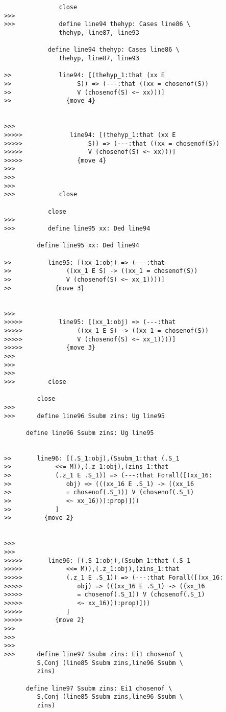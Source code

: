 \documentclass[12pt]{article}
\begin{document}
\begin{verbatim}
               close
>>>
>>>            define line94 thehyp: Cases line86 \
               thehyp, line87, line93

            define line94 thehyp: Cases line86 \
               thehyp, line87, line93

>>             line94: [(thehyp_1:that (xx E
>>                  S)) => (---:that ((xx = chosenof(S))
>>                  V (chosenof(S) <~ xx)))]
>>               {move 4}


>>>
>>>>>             line94: [(thehyp_1:that (xx E
>>>>>                  S)) => (---:that ((xx = chosenof(S))
>>>>>                  V (chosenof(S) <~ xx)))]
>>>>>               {move 4}
>>>
>>>
>>>
>>>            close

            close
>>>
>>>         define line95 xx: Ded line94

         define line95 xx: Ded line94

>>          line95: [(xx_1:obj) => (---:that
>>               ((xx_1 E S) -> ((xx_1 = chosenof(S))
>>               V (chosenof(S) <~ xx_1))))]
>>            {move 3}


>>>
>>>>>          line95: [(xx_1:obj) => (---:that
>>>>>               ((xx_1 E S) -> ((xx_1 = chosenof(S))
>>>>>               V (chosenof(S) <~ xx_1))))]
>>>>>            {move 3}
>>>
>>>
>>>
>>>         close

         close
>>>
>>>      define line96 Ssubm zins: Ug line95

      define line96 Ssubm zins: Ug line95


>>       line96: [(.S_1:obj),(Ssubm_1:that (.S_1
>>            <<= M)),(.z_1:obj),(zins_1:that
>>            (.z_1 E .S_1)) => (---:that Forall([(xx_16:
>>               obj) => (((xx_16 E .S_1) -> ((xx_16
>>               = chosenof(.S_1)) V (chosenof(.S_1)
>>               <~ xx_16))):prop)]))
>>            ]
>>         {move 2}


>>>
>>>
>>>>>       line96: [(.S_1:obj),(Ssubm_1:that (.S_1
>>>>>            <<= M)),(.z_1:obj),(zins_1:that
>>>>>            (.z_1 E .S_1)) => (---:that Forall([(xx_16:
>>>>>               obj) => (((xx_16 E .S_1) -> ((xx_16
>>>>>               = chosenof(.S_1)) V (chosenof(.S_1)
>>>>>               <~ xx_16))):prop)]))
>>>>>            ]
>>>>>         {move 2}
>>>
>>>
>>>
>>>      define line97 Ssubm zins: Ei1 chosenof \
         S,Conj (line85 Ssubm zins,line96 Ssubm \
         zins)

      define line97 Ssubm zins: Ei1 chosenof \
         S,Conj (line85 Ssubm zins,line96 Ssubm \
         zins)


\end{verbatim}
\end{document}
